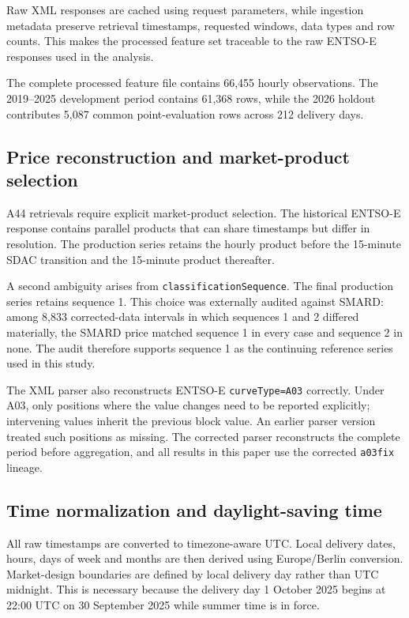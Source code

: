 Raw XML responses are cached using request parameters, while ingestion metadata preserve retrieval timestamps, requested windows, data types and row counts. This makes the processed feature set traceable to the raw ENTSO-E responses used in the analysis.

The complete processed feature file contains 66,455 hourly observations. The 2019--2025 development period contains 61,368 rows, while the 2026 holdout contributes 5,087 common point-evaluation rows across 212 delivery days.

\subsection{Price reconstruction and market-product selection}

A44 retrievals require explicit market-product selection. The historical ENTSO-E response contains parallel products that can share timestamps but differ in resolution. The production series retains the hourly product before the 15-minute SDAC transition and the 15-minute product thereafter.

A second ambiguity arises from \texttt{classificationSequence}. The final production series retains sequence 1. This choice was externally audited against SMARD: among 8,833 corrected-data intervals in which sequences 1 and 2 differed materially, the SMARD price matched sequence 1 in every case and sequence 2 in none. The audit therefore supports sequence 1 as the continuing reference series used in this study.

The XML parser also reconstructs ENTSO-E \texttt{curveType=A03} correctly. Under A03, only positions where the value changes need to be reported explicitly; intervening values inherit the previous block value. An earlier parser version treated such positions as missing. The corrected parser reconstructs the complete period before aggregation, and all results in this paper use the corrected \texttt{a03fix} lineage.

\subsection{Time normalization and daylight-saving time}

All raw timestamps are converted to timezone-aware UTC. Local delivery dates, hours, days of week and months are then derived using Europe/Berlin conversion. Market-design boundaries are defined by local delivery day rather than UTC midnight. This is necessary because the delivery day 1 October 2025 begins at 22:00 UTC on 30 September 2025 while summer time is in force.

